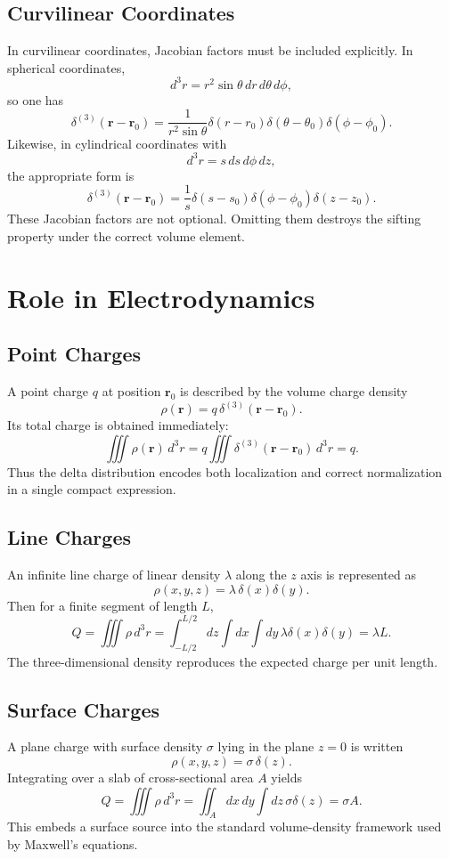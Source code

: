 \documentclass[12pt]{article}
\begin{document}
\subsection{Curvilinear Coordinates}
In curvilinear coordinates, Jacobian factors must be included explicitly. In spherical coordinates,
\[
d^3r=r^2\sin\theta\,dr\,d\theta\,d\phi,
\]
so one has
\[
\delta^{(3)}(\mathbf r-\mathbf r_0)
=
\frac{1}{r^2\sin\theta}\delta(r-r_0)\delta(\theta-\theta_0)\delta(\phi-\phi_0).
\]
Likewise, in cylindrical coordinates with
\[
d^3r=s\,ds\,d\phi\,dz,
\]
the appropriate form is
\[
\delta^{(3)}(\mathbf r-\mathbf r_0)
=
\frac{1}{s}\delta(s-s_0)\delta(\phi-\phi_0)\delta(z-z_0).
\]
These Jacobian factors are not optional. Omitting them destroys the sifting property under the correct volume element.

\section{Role in Electrodynamics}
\subsection{Point Charges}
A point charge $q$ at position $\mathbf r_0$ is described by the volume charge density
\[
\rho(\mathbf r)=q\,\delta^{(3)}(\mathbf r-\mathbf r_0).
\]
Its total charge is obtained immediately:
\[
\iiint \rho(\mathbf r)\,d^3r
=
q\iiint \delta^{(3)}(\mathbf r-\mathbf r_0)\,d^3r
=
q.
\]
Thus the delta distribution encodes both localization and correct normalization in a single compact expression.

\subsection{Line Charges}
An infinite line charge of linear density $\lambda$ along the $z$ axis is represented as
\[
\rho(x,y,z)=\lambda\,\delta(x)\delta(y).
\]
Then for a finite segment of length $L$,
\[
Q=\iiint \rho\,d^3r
=
\int_{-L/2}^{L/2}\!dz\int dx\int dy\,\lambda\delta(x)\delta(y)
=
\lambda L.
\]
The three-dimensional density reproduces the expected charge per unit length.

\subsection{Surface Charges}
A plane charge with surface density $\sigma$ lying in the plane $z=0$ is written
\[
\rho(x,y,z)=\sigma\,\delta(z).
\]
Integrating over a slab of cross-sectional area $A$ yields
\[
Q=\iiint \rho\,d^3r
=
\iint_A dx\,dy\int dz\,\sigma\delta(z)
=
\sigma A.
\]
This embeds a surface source into the standard volume-density framework used by Maxwell's equations.
\end{document}
